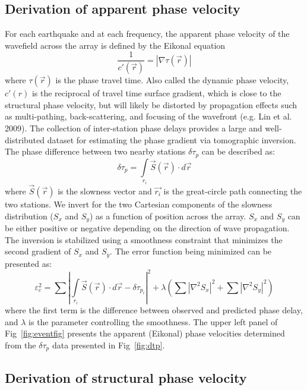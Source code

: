 \documentclass[referee]{gji}
\begin{document}
\subsection{Derivation of apparent phase velocity}
\label{sec:apv}

For each earthquake and at each frequency, the apparent phase velocity of the wavefield across the array is defined by the Eikonal equation 
\[
\frac{1}{c'(\vec{r})} = |\nabla \tau(\vec{r})|
\]
where $\tau(\vec{r})$ is the phase travel time. Also called the dynamic phase velocity, $c'(r)$ is the reciprocal of travel time surface gradient, which is close to the structural phase velocity, but will likely be distorted by propagation effects such as multi-pathing, back-scattering, and focusing of the wavefront (e.g. Lin et al. 2009).  The collection of inter-station phase delays provides a large and well-distributed dataset for estimating the phase gradient via tomographic inversion. The phase difference between two nearby stations $\delta \tau_p$ can be described as:
\[
\delta \tau_p = \int\limits_{r_i} \vec{S}(\vec{r}) \cdot d\vec{r}
\]
where $\vec{S}(\vec{r})$ is the slowness vector and $\vec{r_i}$ is the great-circle path connecting the two stations. We invert for the two Cartesian components of the slowness distribution ($S_x$ and $S_y$) as a function of position across the array. $S_x$ and $S_y$ can be either positive or negative depending on the direction of wave propagation.  The inversion is stabilized using a smoothness constraint that minimizes the second gradient of $S_x$ and $S_y$. The error function being minimized can be presented as:
\[
\varepsilon_{c}^2 = \sum \left| \int\limits_{r_i} \vec{S}(\vec{r}) \cdot d\vec{r} - \delta \tau_{p_i}\right|^2 + \lambda \left( \sum |\nabla^2 S_x|^2 + \sum |\nabla^2 S_y|^2 \right)
\]
where the first term is the difference between observed and predicted phase delay, and $\lambda$ is the parameter controlling the smoothness. The upper left panel of Fig~\ref{fig:eventfig} presents the apparent (Eikonal) phase velocities determined from the $\delta \tau_p$ data presented in Fig~\ref{fig:dtp}.    


\subsection{Derivation of structural phase velocity}
\end{document}

